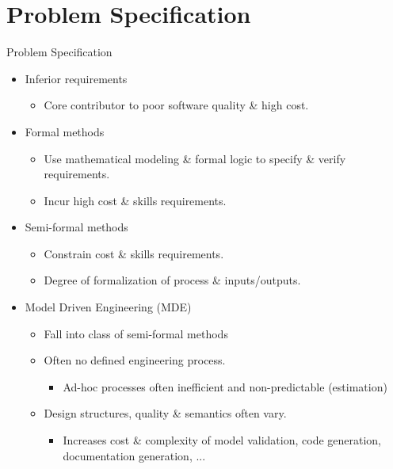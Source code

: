 \section{Problem Specification}

\begin{frame}{Problem Specification}
\initclock

  \begin{itemize}
    \item<+-| alert@+> Inferior requirements
      \begin{itemize}
      	\item Core contributor to poor software quality \& high cost.
      \end{itemize}
    \item<+-| alert@+> Formal methods
      \begin{itemize}
	      \item Use mathematical modeling \& formal logic to specify \& verify requirements.
    	  \item Incur high cost \& skills requirements.
      \end{itemize}
    \item<+-| alert@+> Semi-formal methods
      \begin{itemize}
		\item Constrain cost \& skills requirements.
		\item Degree of formalization of process \& inputs/outputs.
	  \end{itemize}
   \item<+-| alert@+> Model Driven Engineering (MDE)
   	  \begin{itemize}
   	  	\item Fall into class of semi-formal methods
		  \item Often no defined engineering process.
			 \begin{itemize}
			  \item Ad-hoc processes often inefficient and non-predictable (estimation)
			 \end{itemize}
		  \item Design structures, quality \& semantics often vary.
			 \begin{itemize}
			 \item Increases cost \& complexity of model validation, code generation, documentation generation, ...
		  \end{itemize}
	  \end{itemize}
  \end{itemize}

\end{frame}

